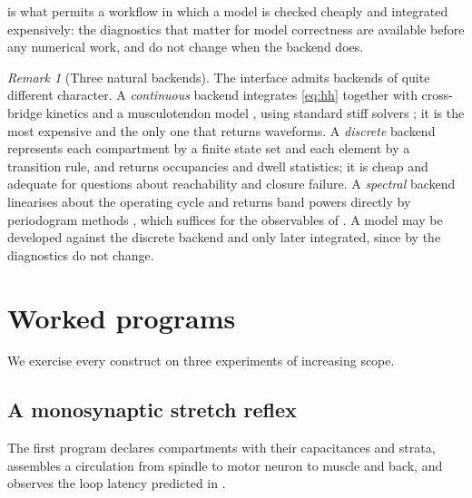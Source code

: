 \documentclass[11pt,twocolumn,a4paper]{article}
\theoremstyle{thmstyle}
\theoremstyle{definition}
\theoremstyle{remark}
\newtheorem{remark}[theorem]{Remark}
\begin{document}
 is what permits a workflow in which a model is
checked cheaply and integrated expensively: the diagnostics that matter for
model correctness are available before any numerical work, and do not change
when the backend does.

\begin{remark}[Three natural backends]
\label{rem:three-backends}
The interface admits backends of quite different character. A
\emph{continuous} backend integrates \eqref{eq:hh} together with cross-bridge
kinetics \citep{huxley1957,zahalak1981} and a musculotendon model
\citep{zajac1989,millard2013}, using standard stiff solvers
\citep{hairer1996,shampine1997}; it is the most expensive and the only one
that returns waveforms. A \emph{discrete} backend represents each compartment
by a finite state set and each element by a transition rule, and returns
occupancies and dwell statistics; it is cheap and adequate for questions about
reachability and closure failure. A \emph{spectral} backend linearises about
the operating cycle and returns band powers directly by periodogram methods
\citep{welch1967}, which suffices for the observables of
. A model may be developed against the discrete backend
and only later integrated, since by  the
diagnostics do not change.
\end{remark}

\section{Worked programs}
\label{sec:programs}

We exercise every construct on three experiments of increasing scope.

\subsection{A monosynaptic stretch reflex}

The first program declares compartments with their capacitances and strata,
assembles a circulation from spindle to motor neuron to muscle and back, and
observes the loop latency predicted in .
\end{document}
